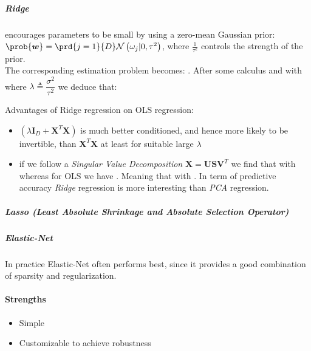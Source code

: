\subparagraph{Ridge}
encourages parameters to be small by using a zero-mean Gaussian prior: $\prob{\bm{w}} = 
\prd{j=1}{D} \mathcal{N}\left(\omega_{j}|0, \tau^{2}\right)$, where $\frac{1}{\tau^{2}}$
controls the strength of the prior.\\
The corresponding  estimation problem becomes:
. After some calculus and with where $\lambda \triangleq 
\dfrac{\sigma^{2}}{\tau^{2}}$ we deduce that:
\begin{center}
\end{center}
Advantages of Ridge regression on OLS regression:
\begin{itemize}
    \item $\left(\lambda\bm{I}_{D}+\bm{X}^{T}\bm{X}\right)$ is much better conditioned, 
        and hence more likely to be invertible, than $\bm{X}^{T}\bm{X}$ at least for 
        suitable large $\lambda$
    \item if we follow a \emph{Singular Value Decomposition} $\bm{X} = \bm{U}\bm{S}
        \bm{V}^{T}$ we find 
        that 
        with 
        whereas for OLS we have . Meaning that with . In term of predictive accuracy
        \emph{Ridge} regression is more interesting than \emph{PCA} regression.
\end{itemize}
\subparagraph{Lasso (Least Absolute Shrinkage and Absolute Selection Operator)}

\subparagraph{Elastic-Net}
In practice Elastic-Net often performs best, since it provides a good combination of
sparsity and regularization.
\paragraph{Strengths}
\begin{itemize}
    \item Simple
    \item Customizable to achieve robustness
\end{itemize}

